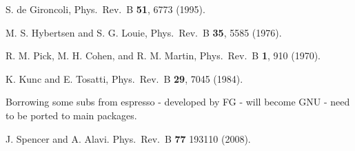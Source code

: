 \documentclass[twocolumn,prb,showpacs,superscriptaddress]{revtex4}
\begin{document}
\begin{thebibliography}{99}
S. de Gironcoli,
Phys.\ Rev.\ B {\bf 51}, 6773 (1995).

M. S. Hybertsen and S. G. Louie,
Phys.\ Rev.\ B {\bf 35}, 5585 (1976).

R. M. Pick, M. H. Cohen, and R. M. Martin,
Phys.\ Rev.\ B {\bf 1}, 910 (1970). 

K. Kunc and E. Tosatti,
Phys.\ Rev.\ B {\bf 29}, 7045 (1984).

Borrowing some subs from espresso - developed by FG - will become
GNU - need to be ported to main packages.

J. Spencer and A. Alavi.
Phys.\ Rev.\ B {\bf 77} 193110 (2008).



\end{thebibliography}
\end{document}
